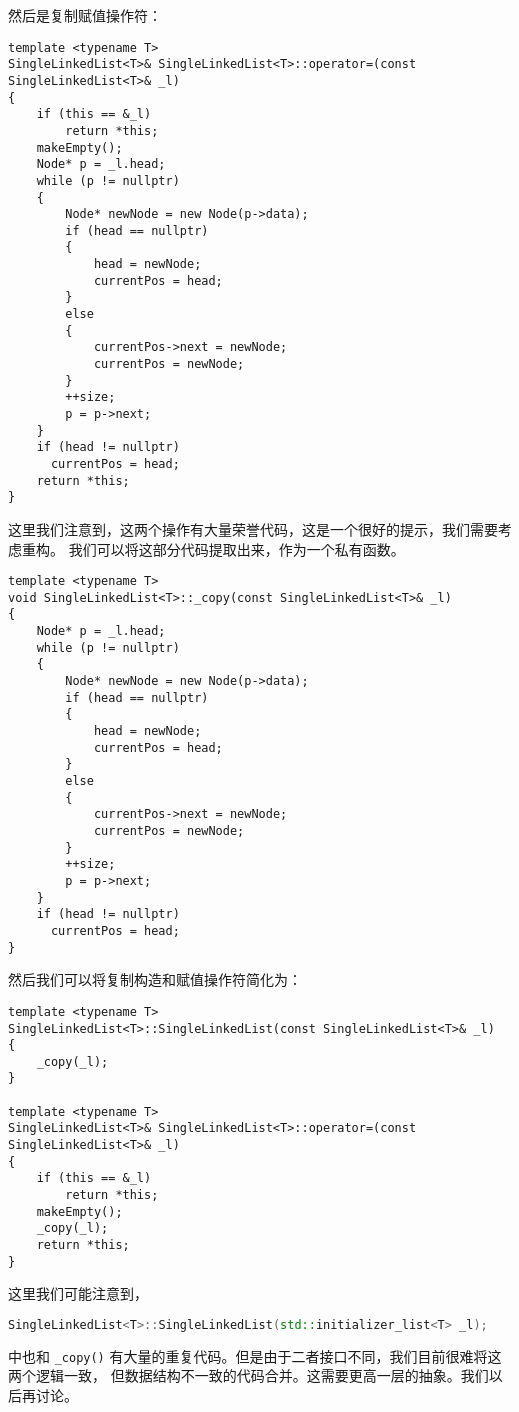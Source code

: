\documentclass[a4paper]{ctexart}
\theoremstyle{definition}
\theoremstyle{definition}
\begin{document}
然后是复制赋值操作符：

\begin{lstlisting}
template <typename T>
SingleLinkedList<T>& SingleLinkedList<T>::operator=(const SingleLinkedList<T>& _l)
{
    if (this == &_l)
        return *this;
    makeEmpty();
    Node* p = _l.head;
    while (p != nullptr)
    {
        Node* newNode = new Node(p->data);
        if (head == nullptr)
        {
            head = newNode;
            currentPos = head;
        }
        else
        {
            currentPos->next = newNode;
            currentPos = newNode;
        }
        ++size;
        p = p->next;
    }
    if (head != nullptr)
      currentPos = head;
    return *this;
}
\end{lstlisting}

这里我们注意到，这两个操作有大量荣誉代码，这是一个很好的提示，我们需要考虑重构。
我们可以将这部分代码提取出来，作为一个私有函数。

\begin{lstlisting}
template <typename T>
void SingleLinkedList<T>::_copy(const SingleLinkedList<T>& _l)
{
    Node* p = _l.head;
    while (p != nullptr)
    {
        Node* newNode = new Node(p->data);
        if (head == nullptr)
        {
            head = newNode;
            currentPos = head;
        }
        else
        {
            currentPos->next = newNode;
            currentPos = newNode;
        }
        ++size;
        p = p->next;
    }
    if (head != nullptr)
      currentPos = head;
}
\end{lstlisting}

然后我们可以将复制构造和赋值操作符简化为：
\begin{lstlisting}
template <typename T>
SingleLinkedList<T>::SingleLinkedList(const SingleLinkedList<T>& _l)
{
    _copy(_l);
}

template <typename T>
SingleLinkedList<T>& SingleLinkedList<T>::operator=(const SingleLinkedList<T>& _l)
{
    if (this == &_l)
        return *this;
    makeEmpty();
    _copy(_l);
    return *this;
}
\end{lstlisting}

这里我们可能注意到，

\begin{lstlisting}[language=c++]
SingleLinkedList<T>::SingleLinkedList(std::initializer_list<T> _l);  
\end{lstlisting}

中也和 \verb|_copy()| 有大量的重复代码。但是由于二者接口不同，我们目前很难将这两个逻辑一致，
但数据结构不一致的代码合并。这需要更高一层的抽象。我们以后再讨论。
\end{document}
